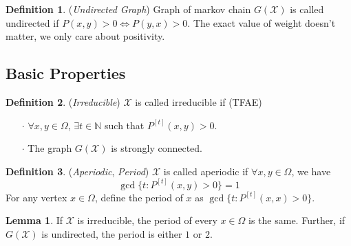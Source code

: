 \documentclass[a4paper, 11pt]{article}
\theoremstyle{definition}
\newtheorem{lemma}{Lemma}
\newtheorem{definition}{Definition}
\begin{document}
\begin{definition} (\textit{Undirected Graph}) Graph of markov chain $G(\mathcal{X})$ is called undirected if $P(x,y)>0 \iff P(y,x)>0$. The exact value of weight doesn't matter, we only care about positivity.
\end{definition}

\subsection{Basic Properties} 
\begin{definition} (\textit{Irreducible}) $\mathcal{X}$ is called irreducible if (TFAE)
\begin{itemize}
	\item[$\cdot$] $\forall x,y\in \Omega$, $\exists t\in \mathbb{N}$ such that $P^{[t]}(x,y)>0$.
	\item[$\cdot$] The graph $G(\mathcal{X})$ is strongly connected.
\end{itemize}
\end{definition}

\begin{definition} (\textit{Aperiodic}, \textit{Period}) $\mathcal{X}$ is called aperiodic if $\forall x,y\in \Omega$, we have
$$\gcd\{t: P^{[t]}(x,y)>0\}=1$$
For any vertex $x\in \Omega$, define the period of $x$ as $\gcd\{t: P^{[t]}(x,x)>0\}$.
\end{definition}

\begin{lemma} If $\mathcal{X}$ is irreducible, the period of every $x\in \Omega$ is the same. Further, if $G(\mathcal{X})$ is undirected, the period is either $1$ or $2$.
\end{lemma}
\end{document}
